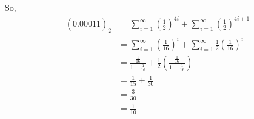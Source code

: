 \documentclass[12pt]{article}
\begin{document}
\begin{enumerate}[a.]
    \bigskip

    So,
    \setcounter{equation}{0}
    \begin{align}
        (0.0\overline{0011})_2 &= \sum\limits_{i=1}^{\infty} (\frac{1}{2})^{4i} + \sum\limits_{i=1}^{\infty} (\frac{1}{2})^{4i+1}\\
        &= \sum\limits_{i=1}^{\infty} (\frac{1}{16})^{i} + \sum\limits_{i=1}^{\infty} \frac{1}{2}(\frac{1}{16})^{i}\\
        &= \frac{\frac{1}{16}}{1 - \frac{1}{16}} + \frac{1}{2}(\frac{\frac{1}{16}}{1 - \frac{1}{16}})\\
        &= \frac{1}{15} + \frac{1}{30}\\
        &= \frac{3}{30}\\
        &= \frac{1}{10}
    \end{align}

\end{enumerate}
\end{document}
